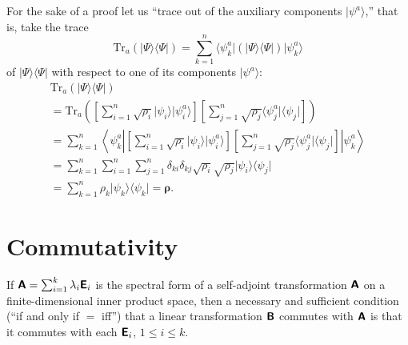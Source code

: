 {\color{OliveGreen}\bproof
For the sake of a proof let us ``trace out of the auxiliary components $\vert \psi^a\rangle$,'' that is,
take the trace
\begin{equation}
\textrm{Tr}_{a} (\vert \Psi\rangle \langle \Psi \vert )
=
\sum_{k=1}^n  \langle \psi^a_{k} \vert  (\vert \Psi\rangle \langle \Psi \vert ) \vert \psi^a_{k}\rangle
\end{equation}
of
$\vert \Psi\rangle \langle \Psi \vert$
with respect to one of its components $\vert \psi^a\rangle$:
\begin{equation}
\begin{split}
\textrm{Tr}_{a}\left(
\vert \Psi\rangle \langle \Psi \vert
\right)
\\=
\textrm{Tr}_{a}\left(
\left[\sum_{i=1}^n \sqrt{\rho_{i}}  \vert \psi_{i}\rangle  \vert \psi^a_{i}\rangle \right]
\left[\sum_{j=1}^n \sqrt{\rho_{j}}  \langle  \psi^a_{j}\vert \langle \psi_{j}\vert \right]
\right)
\\=
\sum_{k=1}^n  \left\langle \psi^a_{k} \left\vert
\left[\sum_{i=1}^n \sqrt{\rho_{i}}  \vert \psi_{i}\rangle  \vert \psi^a_{i}\rangle \right]
\left[\sum_{j=1}^n \sqrt{\rho_{j}}  \langle  \psi^a_{j}\vert \langle \psi_{j}\vert \right]
\right\vert \psi^a_{k}\right\rangle
\\=
\sum_{k=1}^n \sum_{i=1}^n \sum_{j=1}^n  \delta_{ki} \delta_{kj}
\sqrt{\rho_{i}} \sqrt{\rho_{j}}
\vert \psi_{i}\rangle
\langle \psi_{j}\vert
\\=
\sum_{k=1}^n
\rho_{k}
\vert \psi_{k}\rangle
\langle \psi_{k}\vert
= {\boldsymbol{\rho}}
.
\label{2015-puranproof1}
\end{split}
\end{equation}
}






\section{Commutativity}

If $\textsf{\textbf{A}}=\sum_{i=1}^k \lambda_i\textsf{\textbf{E}}_i$
is the spectral form of a self-adjoint transformation  $\textsf{\textbf{A}}$
on a finite-dimensional inner product space,
then a necessary and sufficient condition (``if and only if $=$ iff'')
that a linear transformation
 $\textsf{\textbf{B}}$ commutes with
 $\textsf{\textbf{A}}$
is that it commutes with each
$\textsf{\textbf{E}}_i$, $1\le i\le k$.

